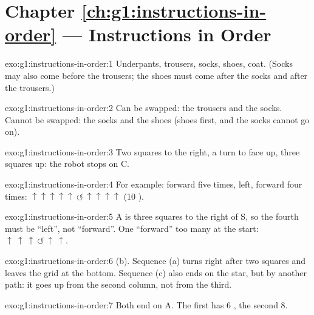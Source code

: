\section*{Chapter \ref{ch:g1:instructions-in-order} --- Instructions in Order}

\begin{solution}{exo:g1:instructions-in-order:1}
Underpants, trousers, socks, shoes, coat. (Socks may also come before the trousers;
the shoes must come after the socks and after the trousers.)
\end{solution}

\begin{solution}{exo:g1:instructions-in-order:2}
Can be swapped: the trousers and the socks. Cannot be swapped: the socks and
the shoes (shoes first, and the socks cannot go on).
\end{solution}

\begin{solution}{exo:g1:instructions-in-order:3}
Two squares to the right, a turn to face up, three squares up: the robot stops
on C.
\end{solution}

\begin{solution}{exo:g1:instructions-in-order:4}
For example: forward five times, left, forward four times:
$\uparrow\uparrow\uparrow\uparrow\uparrow\ \circlearrowleft\ \uparrow\uparrow\uparrow\uparrow$
(10 ).
\end{solution}

\begin{solution}{exo:g1:instructions-in-order:5}
A is three squares to the right of S, so the fourth  must be
``left'', not ``forward''. One ``forward'' too many at the start:
$\uparrow\ \uparrow\ \uparrow\ \circlearrowleft\ \uparrow\ \uparrow$.
\end{solution}

\begin{solution}{exo:g1:instructions-in-order:6}
(b). Sequence (a) turns right after two squares and leaves the grid at the
bottom. Sequence (c) also ends on the star, but by another path: it goes up
from the second column, not from the third.
\end{solution}

\begin{solution}{exo:g1:instructions-in-order:7}
Both end on A. The first has 6 , the second 8.
\end{solution}

